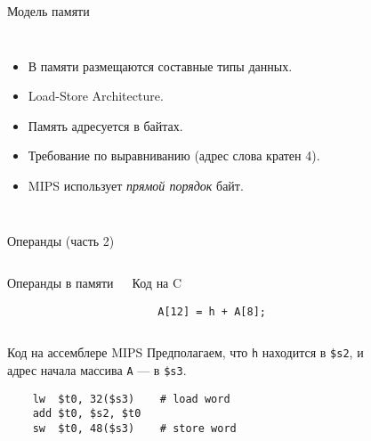 \begin{frame}{Модель памяти}
\begin{columns}
    \column{6.5cm}
\pause
\begin{itemize}[<+->]
    \item В памяти размещаются составные типы данных.
    \item Load-Store Architecture.
    \item Память адресуется в байтах.
    \item Требование по выравниванию (адрес слова кратен 4).
    \item MIPS использует \emph{прямой порядок} байт.
\end{itemize}
\pause
    \column{5cm}
\end{columns}

\end{frame}

\begin{frame}[fragile]{Операнды (часть 2)}
\begin{columns}
    \column{5.5cm}
Операнды в памяти
\begin{block}{Код на C}
\begin{verbatim}
    A[12] = h + A[8];\end{verbatim}
\end{block}

    \column{5.5cm}
\end{columns}

\pause
\begin{columns}
    \column{9cm}
\begin{block}{Код на ассемблере MIPS}
Предполагаем, что \texttt{h} находится в \texttt{\$s2}, и\\
адрес начала массива \texttt{A} — в \texttt{\$s3}.
\begin{verbatim}
    lw  $t0, 32($s3)    # load word
    add $t0, $s2, $t0
    sw  $t0, 48($s3)    # store word\end{verbatim}
\end{block}
    \column{2cm}
\end{columns}
\end{frame}

